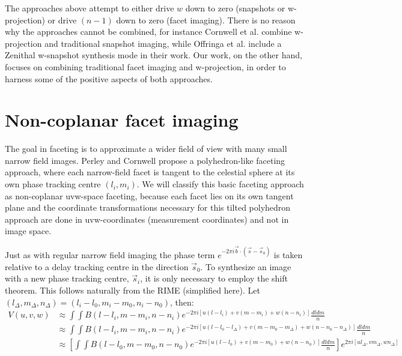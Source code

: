 The approaches above attempt to either drive $w$ down to zero (snapshots or w-projection) or drive $(n-1)$ down to zero (facet imaging). There is no reason why
the approaches cannot be combined, for instance Cornwell et al. \cite{cornwell2012wide} combine w-projection and traditional snapshot imaging, while
Offringa et al. include a Zenithal w-snapshot synthesis mode in their work. Our work, on the other hand, focuses on combining traditional facet imaging and w-projection, 
in order to harness some of the positive aspects of both approaches.

\section{Non-coplanar facet imaging}
The goal in faceting is to approximate a wider field of view with many small narrow field images. Perley and Cornwell \cite{cornwell1992radio} propose a 
polyhedron-like faceting approach, where each narrow-field facet is tangent to the celestial sphere at its own phase tracking centre $(l_i,m_i)$. We will classify
this basic faceting approach as non-coplanar uvw-space faceting, because each facet lies on its own tangent plane and the coordinate transformations
necessary for this tilted polyhedron approach are done in uvw-coordinates (measurement coordinates) and not in image space.

Just as with regular narrow field imaging the phase term $e^{-2\pi i \vec{b}\cdot(\vec{s}-\vec{s}_0)}$ is taken relative to a delay tracking centre in the direction
$\vec{s}_0$. To synthesize an image with a new phase tracking centre, $\vec{s}_i$, it is only necessary to employ the shift theorem. This follows naturally from the
RIME (simplified here). Let $(l_\Delta,m_\Delta,n_\Delta) = (l_i-l_0,m_i-m_0,n_i-n_0)$, then:
\begin{equation}
  \label{eqn_faceting}
  \begin{split}
    V(u,v,w)&\approx\int{\int{B(l-l_i,m-m_i,n-n_i)e^{-2{\pi}i[u(l-l_i)+v(m-m_i)+w(n-n_i)]}\frac{dldm}{n}}}\\
    &\approx\int{\int{B(l-l_i,m-m_i,n-n_i)e^{-2{\pi}i[u(l-l_0-l_\Delta)+v(m-m_0-m_\Delta)+w(n-n_0-n_\Delta)]}\frac{dldm}{n}}}\\
    &\approx\left[\int{\int{B(l-l_0,m-m_0,n-n_0)e^{-2{\pi}i[u(l-l_0)+v(m-m_0)+w(n-n_0)]}\frac{dldm}{n}}}\right]e^{2{\pi}i[ul_\Delta,vm_\Delta,wn_\Delta]}\\
  \end{split}
\end{equation}

